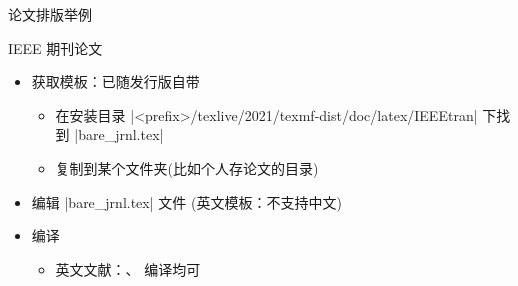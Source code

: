 \begin{frame}[fragile]{论文排版举例}
  \begin{exampleblock}{IEEE 期刊论文}
    \begin{itemize}
      \item 获取模板：已随发行版自带
        \begin{itemize}
          \item 在安装目录 |<prefix>/texlive/2021/texmf-dist/doc/latex/IEEEtran|
            下找到 |bare_jrnl.tex|
          \item 复制到某个文件夹(比如个人存论文的目录)
        \end{itemize}
      \item 编辑 |bare_jrnl.tex| 文件 (英文模板：不支持中文)
      \item 编译
        \begin{itemize}
          \item 英文文献：\XeLaTeX{}、\pdfLaTeX{} 编译均可
        \end{itemize}
    \end{itemize}
  \end{exampleblock}
\end{frame}
